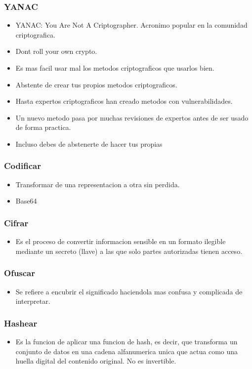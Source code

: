 \documentclass[11pt]{article}
\begin{document}
\subsubsection{YANAC}
\label{sec:orge9a899f}
\begin{itemize}
\item YANAC: You Are Not A Criptographer. Acronimo popular en la comunidad criptografica.
\item Dont roll your own crypto.
\item Es mas facil usar mal los metodos criptograficos que usarlos bien.
\item Abstente de crear tus propios metodos criptograficos.
\item Hasta expertos criptograficos han creado metodos con vulnerabilidades.
\item Un nuevo metodo pasa por muchas revisiones de expertos antes de ser usado de forma practica.
\item Incluso debes de abstenerte de hacer tus propias
\end{itemize}
\subsubsection{Codificar}
\label{sec:org688aa64}
\begin{itemize}
\item Transformar de una representacion a otra sin perdida.
\item Base64
\end{itemize}
\subsubsection{Cifrar}
\label{sec:org6453012}
\begin{itemize}
\item Es el proceso de convertir informacion sensible en un formato ilegible mediante un secreto (llave) a las que solo partes autorizadas tienen acceso.
\end{itemize}
\subsubsection{Ofuscar}
\label{sec:orgaf5fa95}
\begin{itemize}
\item Se refiere a encubrir el significado haciendola mas confusa y complicada de interpretar.
\end{itemize}
\subsubsection{Hashear}
\label{sec:org4fca66a}
\begin{itemize}
\item Es la funcion de aplicar una funcion de hash, es decir, que transforma un conjunto de datos en una cadena alfanumerica unica que actua como una huella digital del contenido original. No es invertible.
\end{itemize}
\end{document}
